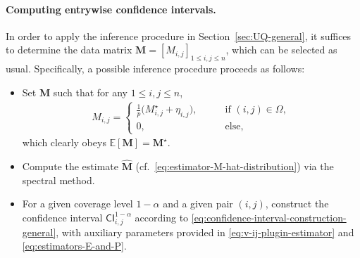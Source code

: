 \paragraph{Computing entrywise confidence intervals.} 
%
In order to apply the inference procedure in Section~\ref{sec:UQ-general}, it suffices to determine the data matrix $\bm{M}=[M_{i,j}]_{1\leq i,j\leq n}$, which can be selected as usual. Specifically, a possible inference procedure proceeds as follows:
%
\begin{itemize}
	\item  Set $\bm{M}$ such that for any $1\leq i,j \leq n$, 
%
\begin{align}
	M_{i,j} = \begin{cases} \frac{1}{p} \big( M_{i,j}^{\star} + \eta_{i,j} \big), \qquad & \text{if } (i,j)\in \Omega, \\ 0, &\text{else}, \end{cases}
\end{align}
%
which clearly obeys $\mathbb{E}[\bm{M}]=\bm{M}^{\star}$. 

	\item Compute the estimate $\widehat{\bm{M}}$ (cf.~\eqref{eq:estimator-M-hat-distribution}) via the spectral method.

	\item For a given coverage level $1-\alpha$ and a given pair $(i,j)$, 
		construct the confidence interval $\mathsf{CI}_{i,j}^{1-\alpha}$ according to \eqref{eq:confidence-interval-construction-general}, 
		with auxiliary parameters provided in \eqref{eq:v-ij-plugin-estimator} and \eqref{eq:estimators-E-and-P}. 

\end{itemize}
 


